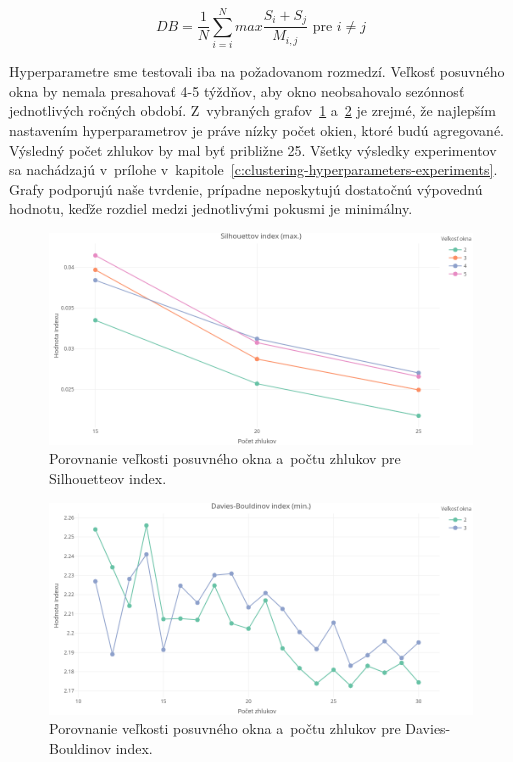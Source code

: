 \documentclass[a4paper,twoside,slovak,12pt,appendix]{article}
\begin{document}
\begin{equation}
  \label{eq:davies-bouldin-index}
  DB = \frac{1}{N} \sum^N_{i = i} max \frac{S_i + S_j}{M_{i, j}} \text{ pre } i \neq j
\end{equation}

\noindent
Hyperparametre sme testovali iba na požadovanom rozmedzí. Veľkosť posuvného okna
by nemala presahovať 4-5 týždňov, aby okno neobsahovalo sezónnosť jednotlivých
ročných období. Z~vybraných grafov~\ref{fig:cvi-sparse-sil}
a~\ref{fig:cvi-dense-db} je zrejmé, že najlepším nastavením hyperparametrov je
práve nízky počet okien, ktoré budú agregované. Výsledný počet zhlukov by mal
byť približne 25. Všetky výsledky experimentov sa nachádzajú v~prílohe
v~kapitole~\ref{c:clustering-hyperparameters-experiments}. Grafy podporujú naše
tvrdenie, prípadne neposkytujú dostatočnú výpovednú hodnotu, keďže rozdiel medzi
jednotlivými pokusmi je minimálny.

\begin{figure}[htbp]
  \centering
  \includegraphics[width=\textwidth]{cvi/dtw_basic_workdays_sparse/201902271850-Sil-dtw_basic_workdays_sparse.png}
  \caption{Porovnanie veľkosti posuvného okna a~počtu zhlukov pre Silhouetteov index.}
	\label{fig:cvi-sparse-sil}
\end{figure}
\begin{figure}[htbp]
  \centering
  \includegraphics[width=\textwidth]{cvi/dtw_basic_workdays_dense/201902271851-DB-dtw_basic_workdays_dense.png}
  \caption{Porovnanie veľkosti posuvného okna a~počtu zhlukov pre Davies-Bouldinov index.}
	\label{fig:cvi-dense-db}
\end{figure}
\end{document}
